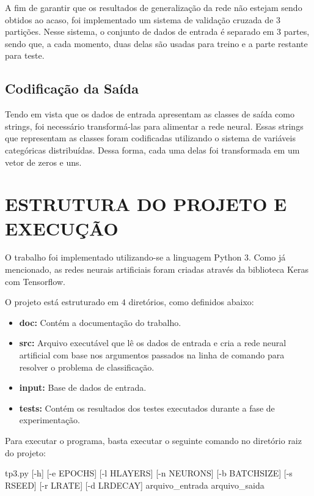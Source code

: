 \documentclass[12pt]{article}
\begin{document}
A fim de garantir que os resultados de generalização da rede não estejam
sendo obtidos ao acaso, foi implementado um sistema de validação cruzada
de 3 partições. Nesse sistema, o conjunto de dados de entrada é separado
em 3 partes, sendo que, a cada momento, duas delas são usadas para
treino e a parte restante para teste.

\subsection{Codificação da Saída}

Tendo em vista que os dados de entrada apresentam as classes de saída
como strings, foi necessário transformá-las para alimentar a rede neural.
Essas strings que representam as classes foram codificadas utilizando
o sistema de variáveis categóricas distribuídas. Dessa forma, cada uma
delas foi transformada em um vetor de zeros e uns.

\section{ESTRUTURA DO PROJETO E EXECUÇÃO}

O trabalho foi implementado utilizando-se a linguagem Python 3. Como já
mencionado, as redes neurais artificiais foram criadas através da
biblioteca Keras com Tensorflow.

O projeto está estruturado em $ 4 $ diretórios, como definidos abaixo:

\begin{itemize}
	\item \textbf{doc:} Contém a documentação do trabalho.
	\item \textbf{src:} Arquivo executável que lê os dados de entrada
	e cria a rede neural artificial com base nos argumentos passados
	na linha de comando para resolver o problema de classificação.
	\item \textbf{input:} Base de dados de entrada.
	\item \textbf{tests:} Contém os resultados dos testes executados
	durante a fase de experimentação.
\end{itemize}

Para executar o programa, basta executar o seguinte comando no
diretório raiz do projeto:

\begin{center}
	tp3.py [-h] [-e EPOCHS] [-l HLAYERS] [-n NEURONS] [-b BATCHSIZE]
	              [-s RSEED] [-r LRATE] [-d LRDECAY]
	              arquivo\_entrada arquivo\_saida
\end{center}
\end{document}

